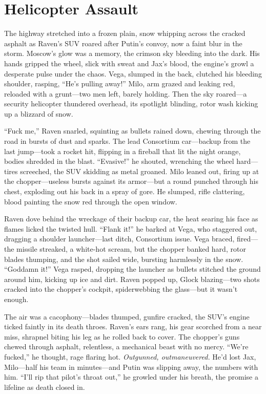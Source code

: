 \documentclass[12pt]{book}
\begin{document}
\section{Helicopter Assault}

The highway stretched into a frozen plain, snow whipping across the cracked asphalt as Raven’s SUV roared after Putin’s convoy, now a faint blur in the storm. Moscow’s glow was a memory, the crimson sky bleeding into the dark. His hands gripped the wheel, slick with sweat and Jax’s blood, the engine’s growl a desperate pulse under the chaos. Vega, slumped in the back, clutched his bleeding shoulder, rasping, “He’s pulling away!” Milo, arm grazed and leaking red, reloaded with a grunt—two men left, barely holding. Then the sky roared—a security helicopter thundered overhead, its spotlight blinding, rotor wash kicking up a blizzard of snow.

“Fuck me,” Raven snarled, squinting as bullets rained down, chewing through the road in bursts of dust and sparks. The lead Consortium car—backup from the last jump—took a rocket hit, flipping in a fireball that lit the night orange, bodies shredded in the blast. “Evasive!” he shouted, wrenching the wheel hard—tires screeched, the SUV skidding as metal groaned. Milo leaned out, firing up at the chopper—useless bursts against its armor—but a round punched through his chest, exploding out his back in a spray of gore. He slumped, rifle clattering, blood painting the snow red through the open window.

Raven dove behind the wreckage of their backup car, the heat searing his face as flames licked the twisted hull. “Flank it!” he barked at Vega, who staggered out, dragging a shoulder launcher—last ditch, Consortium issue. Vega braced, fired—the missile streaked, a white-hot scream, but the chopper banked hard, rotor blades thumping, and the shot sailed wide, bursting harmlessly in the snow. “Goddamn it!” Vega rasped, dropping the launcher as bullets stitched the ground around him, kicking up ice and dirt. Raven popped up, Glock blazing—two shots cracked into the chopper’s cockpit, spiderwebbing the glass—but it wasn’t enough.

The air was a cacophony—blades thumped, gunfire cracked, the SUV’s engine ticked faintly in its death throes. Raven’s ears rang, his gear scorched from a near miss, shrapnel biting his leg as he rolled back to cover. The chopper’s guns chewed through asphalt, relentless, a mechanical beast with no mercy. “We’re fucked,” he thought, rage flaring hot. \textit{Outgunned, outmaneuvered.} He’d lost Jax, Milo—half his team in minutes—and Putin was slipping away, the numbers with him. “I’ll rip that pilot’s throat out,” he growled under his breath, the promise a lifeline as death closed in.
\end{document}

